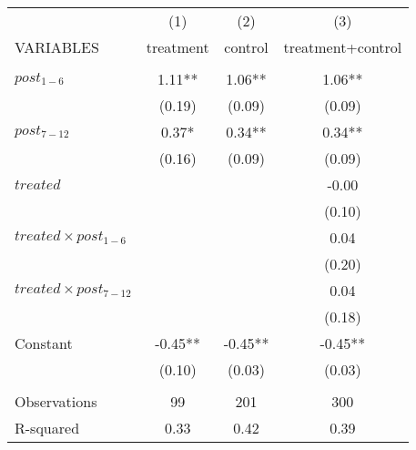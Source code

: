 \begin{tabular}{lccc} \hline
 & (1) & (2) & (3) \\
VARIABLES & treatment & control & treatment+control \\ \hline
 &  &  &  \\
$ post_{1-6} $ & 1.11** & 1.06** & 1.06** \\
 & (0.19) & (0.09) & (0.09) \\
$ post_{7-12} $ & 0.37* & 0.34** & 0.34** \\
 & (0.16) & (0.09) & (0.09) \\
$ treated $ &  &  & -0.00 \\
 &  &  & (0.10) \\
$ treated \times post_{1-6} $ &  &  & 0.04 \\
 &  &  & (0.20) \\
$ treated \times post_{7-12} $ &  &  & 0.04 \\
 &  &  & (0.18) \\
Constant & -0.45** & -0.45** & -0.45** \\
 & (0.10) & (0.03) & (0.03) \\
 &  &  &  \\
Observations & 99 & 201 & 300 \\
 R-squared & 0.33 & 0.42 & 0.39 \\ \hline
\end{tabular}
